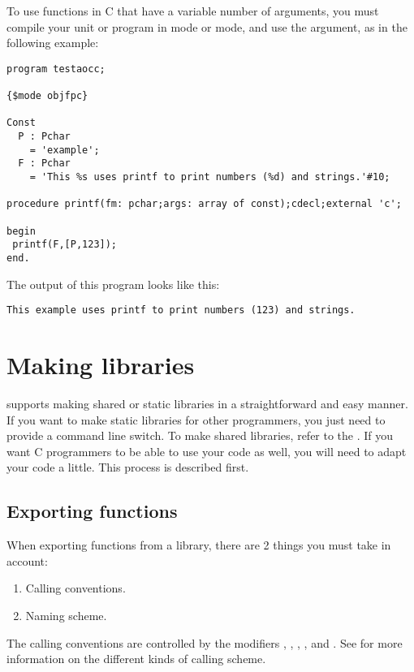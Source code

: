 To use functions in C that have a variable number of arguments, you must
compile your unit or program in  mode or  mode,
and use the  argument, as in the following example:

\begin{verbatim}
program testaocc;

{$mode objfpc}

Const
  P : Pchar
    = 'example';
  F : Pchar
    = 'This %s uses printf to print numbers (%d) and strings.'#10;

procedure printf(fm: pchar;args: array of const);cdecl;external 'c';

begin
 printf(F,[P,123]);
end.
\end{verbatim}
The output of this program looks like this:
\begin{verbatim}
This example uses printf to print numbers (123) and strings.
\end{verbatim}

\section{Making libraries}
\label{se:StaticLib}

\fpc supports making shared or static libraries in a straightforward and
easy manner. If you want to make static libraries for other \fpc programmers,
you just need to provide a command line switch. To make shared libraries,
refer to the . If you want C programmers to be able to use your
code as well, you will need to adapt your code a little. This process
is described first.

\subsection{Exporting functions}

When exporting functions from a library, there are 2 things you must take in
account:

\begin{enumerate}
\item Calling conventions.
\item Naming scheme.
\end{enumerate}
The calling conventions are controlled by the modifiers ,
, , ,  and
. See  for more information on the
different kinds of calling scheme.

